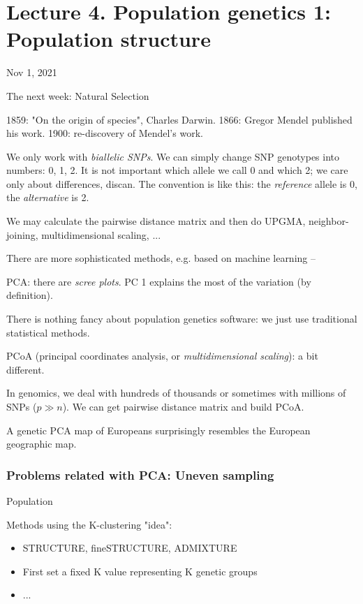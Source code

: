 \documentclass[main.tex]{subfiles}
\begin{document}
\section{Lecture 4.  Population genetics 1: Population structure}
Nov 1, 2021

The next week: Natural Selection


1859: "On the origin of species", Charles Darwin.
1866: Gregor Mendel published his work.
1900: re-discovery of Mendel's work.

We only work with \emph{biallelic SNPs}.
We can simply change SNP genotypes into numbers: 0, 1, 2.
It is not important which allele we call 0 and which 2; we care only about differences, discan.
The convention is like this: the \emph{reference} allele is 0, the \emph{alternative} is 2.

We may calculate the pairwise distance matrix and then do UPGMA, neighbor-joining, multidimensional scaling, ...

There are more sophisticated methods, e.g. based on machine learning -- 

PCA: there are \emph{scree plots}.
PC 1 explains the most of the variation (by definition).

There is nothing fancy about population genetics software: we just use traditional statistical methods.

PCoA (principal coordinates analysis, or \emph{multidimensional scaling}): a bit different.

In genomics, we deal with hundreds of thousands or sometimes with millions of SNPs ($ p \gg n $).
We can get pairwise distance matrix and build PCoA.

A genetic PCA map of Europeans surprisingly resembles the European geographic map.

\subsubsection{Problems related with PCA: Uneven sampling}

Population

Methods using the K-clustering "idea":

\begin{itemize}[noitemsep]
	\item STRUCTURE, fineSTRUCTURE, ADMIXTURE
	\item First set a fixed K value representing K genetic groups
	\item ... %
\end{itemize}
\end{document}
